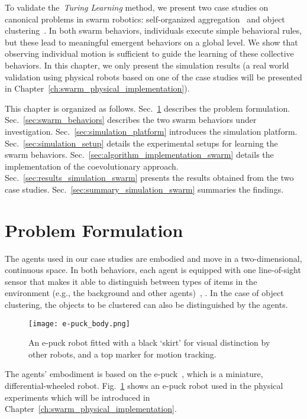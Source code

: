To validate the~\textit{Turing Learning} method, we present two case studies on canonical problems in swarm robotics: self-organized aggregation~\cite{Gauci2014_ijrr} and object clustering~\cite{Melvin2014_aamas}. In both swarm behaviors, individuals execute simple behavioral rules, but these lead to meaningful emergent behaviors on a global level. We show that observing individual motion is sufficient to guide the learning of these collective behaviors. In this chapter, we only present the simulation results (a real world validation using physical robots based on one of the case studies will be presented in Chapter~\ref{ch:swarm_physical_implementation}). 

This chapter is organized as follows. Sec.~\ref{sec:problem_formulation} describes the problem formulation. Sec.~\ref{sec:swarm_behaviors} describes the two swarm behaviors under investigation. Sec.~\ref{sec:simulation_platform} introduces the simulation platform. Sec.~\ref{sec:simulation_setup} details the experimental setups for learning the swarm behaviors. Sec.~\ref{sec:algorithm_implementation_swarm} details the implementation of the coevolutionary approach. Sec.~\ref{sec:results_simulation_swarm} presents the results obtained from the two case studies. Sec.~\ref{sec:summary_simulation_swarm} summaries the findings.

\section{Problem Formulation}\label{sec:problem_formulation}

The agents used in our case studies are embodied and move in a two-dimensional, continuous space. In both behaviors, each agent is equipped with one line-of-sight sensor that makes it able to distinguish between types of items in the environment (e.g., the background and other agents)~\cite{Gauci2014_ijrr}, \cite{Melvin2014_aamas}. In the case of object clustering, the objects to be clustered can also be distinguished by the agents. 
%
\begin{figure}[!t]
	\centering
	\texttt{[image: e-puck\_body.png]}
	\caption{An e-puck robot fitted with a black `skirt' for visual distinction by other robots, and a top marker for motion tracking.}
	\label{fig:e-puck_body}
\end{figure}
%
The agents' embodiment is based on the e-puck~\cite{e-puck}, which is a miniature, differential-wheeled robot. Fig.~\ref{fig:e-puck_body} shows an e-puck robot used in the physical experiments which will be introduced in Chapter~\ref{ch:swarm_physical_implementation}.

